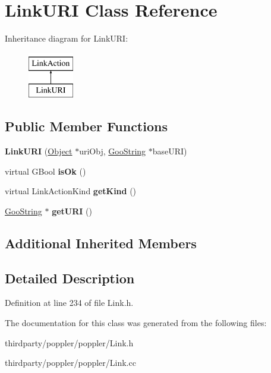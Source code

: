 \hypertarget{class_link_u_r_i}{}\section{Link\+U\+RI Class Reference}
\label{class_link_u_r_i}
Inheritance diagram for Link\+U\+RI\+:\begin{figure}[H]
\begin{center}
\leavevmode
\includegraphics[height=2.000000cm]{class_link_u_r_i}
\end{center}
\end{figure}
\subsection*{Public Member Functions}
\begin{DoxyCompactItemize}
\item 
\mbox{\label{class_link_u_r_i_adb0f3ea666b8ea42e6ce5533efb6d660}} 
{\bfseries Link\+U\+RI} (\hyperlink{class_object}{Object} $\ast$uri\+Obj, \hyperlink{class_goo_string}{Goo\+String} $\ast$base\+U\+RI)
\item 
\mbox{\label{class_link_u_r_i_a8d96130158cb554ef07eb713b77b081f}} 
virtual G\+Bool {\bfseries is\+Ok} ()
\item 
\mbox{\label{class_link_u_r_i_a991d4647a8a2c5c9487f5dc708b008ff}} 
virtual Link\+Action\+Kind {\bfseries get\+Kind} ()
\item 
\mbox{\label{class_link_u_r_i_a8564d5b18cd4968127073b1fe3c5e611}} 
\hyperlink{class_goo_string}{Goo\+String} $\ast$ {\bfseries get\+U\+RI} ()
\end{DoxyCompactItemize}
\subsection*{Additional Inherited Members}


\subsection{Detailed Description}


Definition at line 234 of file Link.\+h.



The documentation for this class was generated from the following files\+:\begin{DoxyCompactItemize}
\item 
thirdparty/poppler/poppler/Link.\+h\item 
thirdparty/poppler/poppler/Link.\+cc\end{DoxyCompactItemize}
